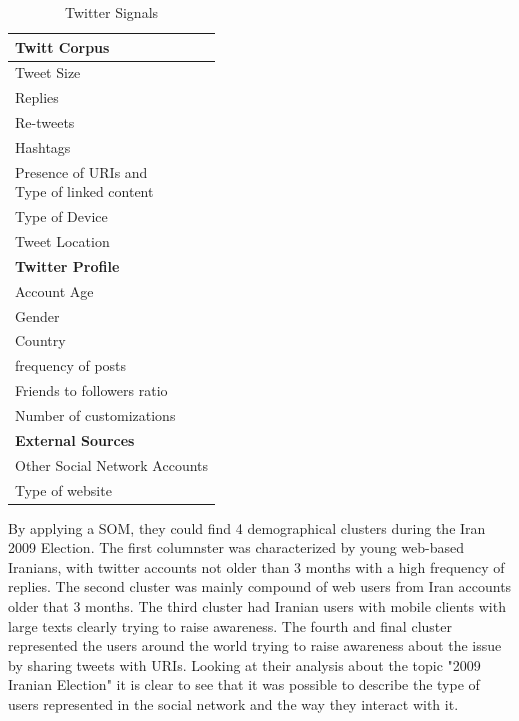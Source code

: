 \begin{table}[H]
  \caption{Twitter Signals}
  \label{tab:twitter_signals}
  \begin{center}
    \begin{tabular}{|l|}
      \hline
      \textbf{Twitt Corpus}  \\
      \hline
      Tweet Size \\
      \hline
      Replies \\
      \hline
      Re-tweets \\
      \hline
      Hashtags  \\
      \hline
      \specialcell{Presence of URIs and \\ Type of linked content} \\
      \hline
      Type of Device   \\
      \hline
      Tweet Location  \\
      \hline                 
      \hline                 
      \textbf{Twitter Profile} \\ 
      \hline
      Account Age   \\
      \hline
      Gender     \\
      \hline
      Country \\    
      \hline
      frequency of posts \\
      \hline
      Friends to followers ratio \\ 
      \hline
      Number of  customizations \\   
      \hline
      \hline
      \textbf{External Sources} \\
      \hline
      Other Social Network Accounts   \\
      \hline
      Type of website\\ 
      \hline
    \end{tabular}
  \end{center}
\end{table}

By applying a SOM, they could find 4 demographical clusters during the Iran 2009 Election. The first columnster was characterized by young web-based Iranians, with twitter accounts not older than 3 months with a high frequency of replies. The second cluster was mainly compound of web users from Iran accounts older that 3 months. The third cluster had Iranian users with mobile clients with large texts clearly trying to raise awareness. The fourth and final cluster represented the users around the world trying to raise awareness about the issue by sharing tweets with URIs.
Looking at their analysis about the topic "2009 Iranian Election" it is clear to see that it was possible to describe the type of users represented in the social network and the way they interact with it.

